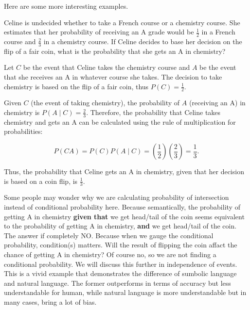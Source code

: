     Here are some more interesting examples.

    \begin{example}
        Celine is undecided whether to take a French course or a chemistry course. She estimates that her probability of receiving an A grade would be \(\frac{1}{2}\) in a French course and \(\frac{2}{3}\) in a chemistry course. If Celine decides to base her decision on the flip of a fair coin, what is the probability that she gets an A in chemistry?
        \end{example}
        
        \begin{solution}
        Let \( C \) be the event that Celine takes the chemistry course and \( A \) be the event that she receives an A in whatever course she takes. The decision to take chemistry is based on the flip of a fair coin, thus \( P(C) = \frac{1}{2} \).
        
        Given \( C \) (the event of taking chemistry), the probability of \( A \) (receiving an A) in chemistry is \( P(A \mid C) = \frac{2}{3} \). Therefore, the probability that Celine takes chemistry and gets an A can be calculated using the rule of multiplication for probabilities:
        
        \[
        P(CA) = P(C)P(A \mid C) = \left(\frac{1}{2}\right)\left(\frac{2}{3}\right) = \frac{1}{3}.
        \]
        
        Thus, the probability that Celine gets an A in chemistry, given that her decision is based on a coin flip, is \(\frac{1}{3}\).
        \end{solution}
        \begin{remark}
        Some people may wonder why we are calculating probability of intersection instead of conditional probability here. Because semantically, the probability of getting A in chemistry
        \textbf{given that} we get head/tail of the coin seems equivalent to the probability of getting A in chemistry, \textbf{and} we get head/tail of the coin. The answer if completely NO.
        Because when we gauge the conditional probability, condition(s) matters. Will the result of flipping the coin affact the chance of getting A in chemistry? Of course no, so we are not finding
        a conditional probability. We will discuss this further in independence of events. This is a vivid example that demonstrates the difference of sumbolic language and natural language. The former
        outperforms in terms of accuracy but less understandable for human, while natural language is more understandable but in many cases, bring a lot of bias.
        \end{remark}

